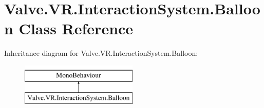 \hypertarget{class_valve_1_1_v_r_1_1_interaction_system_1_1_balloon}{}\section{Valve.\+V\+R.\+Interaction\+System.\+Balloon Class Reference}
\label{class_valve_1_1_v_r_1_1_interaction_system_1_1_balloon}
Inheritance diagram for Valve.\+V\+R.\+Interaction\+System.\+Balloon\+:\begin{figure}[H]
\begin{center}
\leavevmode
\includegraphics[height=2.000000cm]{class_valve_1_1_v_r_1_1_interaction_system_1_1_balloon}
\end{center}
\end{figure}
